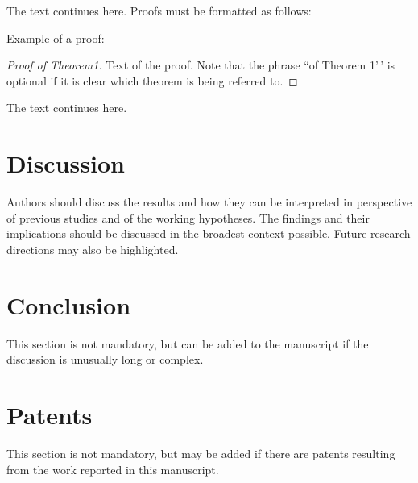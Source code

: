 \documentclass[atmosphere,article,submit,moreauthors,pdftex]{Definitions/mdpi}
\begin{document}
The text continues here. Proofs must be formatted as follows:

Example of a proof:

\begin{proof}[Proof of Theorem1]
Text of the proof. Note that the phrase ``of Theorem 1'\,' is optional
if it is clear which theorem is being referred to.

\end{proof}

The text continues here.

\section{Discussion}\label{discussion-1}

Authors should discuss the results and how they can be interpreted in
perspective of previous studies and of the working hypotheses. The
findings and their implications should be discussed in the broadest
context possible. Future research directions may also be highlighted.

\section{Conclusion}\label{conclusion}

This section is not mandatory, but can be added to the manuscript if the
discussion is unusually long or complex.

\section{Patents}\label{patents}

This section is not mandatory, but may be added if there are patents
resulting from the work reported in this manuscript.


\vspace{6pt}



\end{document}
